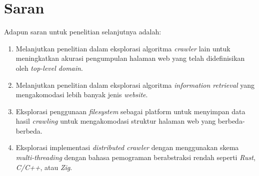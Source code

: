 \section{Saran}
Adapun saran untuk penelitian selanjutnya adalah:
\begin{enumerate} 
  \item Melanjutkan penelitian dalam eksplorasi algoritma \emph{crawler} lain untuk meningkatkan akurasi pengumpulan halaman web yang telah didefinisikan oleh \emph{top-level domain}.
  \item Melanjutkan penelitian dalam eksplorasi algoritma \emph{information retrieval} yang mengakomodasi lebih banyak jenis \emph{website}.
  \item Eksplorasi penggunaan \emph{filesystem} sebagai platform untuk menyimpan data hasil \emph{crawling} untuk mengakomodasi struktur halaman web yang berbeda-berbeda.
  \item Eksplorasi implementasi \emph{distributed crawler} dengan menggunakan skema \emph{multi-threading} dengan bahasa pemograman berabstraksi rendah seperti \emph{Rust}, \emph{C/C++}, atau \emph{Zig}.
\end{enumerate}


\begin{comment}

\end{comment}

